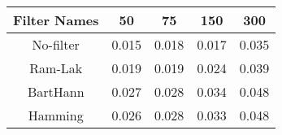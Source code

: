 \begin{tabular}{|c|c|c|c|c|}
\hline 
Filter Names & 50 & 75 & 150 & 300 \\ 
\hline 
No-filter & 0.015 & 0.018 & 0.017 & 0.035 \\ 
Ram-Lak & 0.019 & 0.019 & 0.024 & 0.039 \\ 
BartHann & 0.027 & 0.028 & 0.034 & 0.048 \\ 
Hamming & 0.026 & 0.028 & 0.033 & 0.048 \\ 
\hline 
\end{tabular}